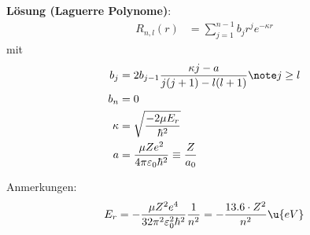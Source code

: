 \documentclass[twocolumn]{summery_4.1}
\begin{document}
\textbf{Lösung (Laguerre Polynome)}:
\begin{align*}
    R_{n,l}(r) &=  \sum_{j=1}^{n-1} b_j r^j e^{-\kappa r}
\end{align*}
mit 
\begin{align*}
    b_j &= 2b_{j-1} \frac{\kappa j - a}{j(j+1) - l (l+1)}\note j\ge l\\
    b_n &= 0\\ 
    \kappa &= \sqrt{\frac{-2\mu E_r}{\hbar^2}} \\
    a &= \frac{\mu Z e^2}{4\pi \varepsilon_0 \hbar^2} \equiv  \frac{Z}{a_0}\\
\end{align*}

Anmerkungen:
\begin{align*}
    E_r = -\frac{\mu Z^2 e^4}{32 \pi^2 \varepsilon_0^2 \hbar^2} \frac{1}{n^2} = - \frac{13.6\cdot Z^2}{n^2} \u{eV}
\end{align*}
\end{document}

